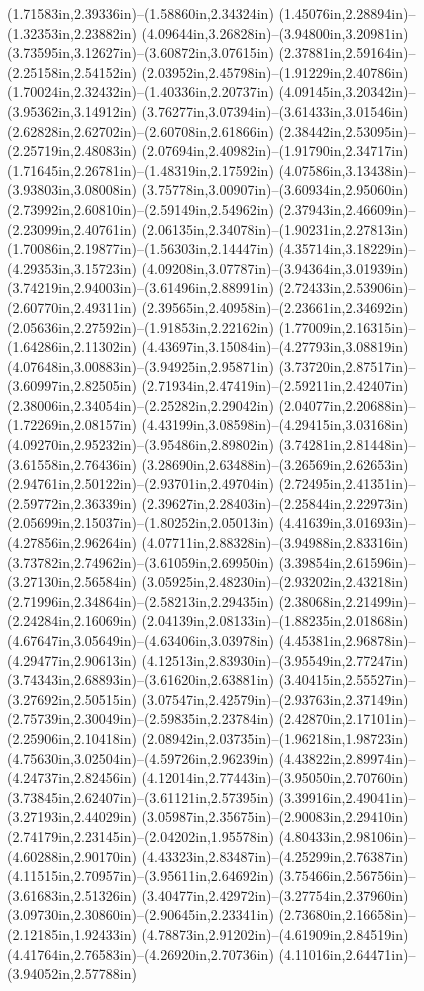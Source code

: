 (1.71583in,2.39336in)--(1.58860in,2.34324in) (1.45076in,2.28894in)--(1.32353in,2.23882in) (4.09644in,3.26828in)--(3.94800in,3.20981in) (3.73595in,3.12627in)--(3.60872in,3.07615in) (2.37881in,2.59164in)--(2.25158in,2.54152in) (2.03952in,2.45798in)--(1.91229in,2.40786in) (1.70024in,2.32432in)--(1.40336in,2.20737in) (4.09145in,3.20342in)--(3.95362in,3.14912in) (3.76277in,3.07394in)--(3.61433in,3.01546in) (2.62828in,2.62702in)--(2.60708in,2.61866in) (2.38442in,2.53095in)--(2.25719in,2.48083in) (2.07694in,2.40982in)--(1.91790in,2.34717in) (1.71645in,2.26781in)--(1.48319in,2.17592in) (4.07586in,3.13438in)--(3.93803in,3.08008in) (3.75778in,3.00907in)--(3.60934in,2.95060in) (2.73992in,2.60810in)--(2.59149in,2.54962in) (2.37943in,2.46609in)--(2.23099in,2.40761in) (2.06135in,2.34078in)--(1.90231in,2.27813in) (1.70086in,2.19877in)--(1.56303in,2.14447in) (4.35714in,3.18229in)--(4.29353in,3.15723in) (4.09208in,3.07787in)--(3.94364in,3.01939in) (3.74219in,2.94003in)--(3.61496in,2.88991in) (2.72433in,2.53906in)--(2.60770in,2.49311in) (2.39565in,2.40958in)--(2.23661in,2.34692in) (2.05636in,2.27592in)--(1.91853in,2.22162in) (1.77009in,2.16315in)--(1.64286in,2.11302in) (4.43697in,3.15084in)--(4.27793in,3.08819in) (4.07648in,3.00883in)--(3.94925in,2.95871in) (3.73720in,2.87517in)--(3.60997in,2.82505in) (2.71934in,2.47419in)--(2.59211in,2.42407in) (2.38006in,2.34054in)--(2.25282in,2.29042in) (2.04077in,2.20688in)--(1.72269in,2.08157in) (4.43199in,3.08598in)--(4.29415in,3.03168in) (4.09270in,2.95232in)--(3.95486in,2.89802in) (3.74281in,2.81448in)--(3.61558in,2.76436in) (3.28690in,2.63488in)--(3.26569in,2.62653in) (2.94761in,2.50122in)--(2.93701in,2.49704in) (2.72495in,2.41351in)--(2.59772in,2.36339in) (2.39627in,2.28403in)--(2.25844in,2.22973in) (2.05699in,2.15037in)--(1.80252in,2.05013in) (4.41639in,3.01693in)--(4.27856in,2.96264in) (4.07711in,2.88328in)--(3.94988in,2.83316in) (3.73782in,2.74962in)--(3.61059in,2.69950in) (3.39854in,2.61596in)--(3.27130in,2.56584in) (3.05925in,2.48230in)--(2.93202in,2.43218in) (2.71996in,2.34864in)--(2.58213in,2.29435in) (2.38068in,2.21499in)--(2.24284in,2.16069in) (2.04139in,2.08133in)--(1.88235in,2.01868in) (4.67647in,3.05649in)--(4.63406in,3.03978in) (4.45381in,2.96878in)--(4.29477in,2.90613in) (4.12513in,2.83930in)--(3.95549in,2.77247in) (3.74343in,2.68893in)--(3.61620in,2.63881in) (3.40415in,2.55527in)--(3.27692in,2.50515in) (3.07547in,2.42579in)--(2.93763in,2.37149in) (2.75739in,2.30049in)--(2.59835in,2.23784in) (2.42870in,2.17101in)--(2.25906in,2.10418in) (2.08942in,2.03735in)--(1.96218in,1.98723in) (4.75630in,3.02504in)--(4.59726in,2.96239in) (4.43822in,2.89974in)--(4.24737in,2.82456in) (4.12014in,2.77443in)--(3.95050in,2.70760in) (3.73845in,2.62407in)--(3.61121in,2.57395in) (3.39916in,2.49041in)--(3.27193in,2.44029in) (3.05987in,2.35675in)--(2.90083in,2.29410in) (2.74179in,2.23145in)--(2.04202in,1.95578in) (4.80433in,2.98106in)--(4.60288in,2.90170in) (4.43323in,2.83487in)--(4.25299in,2.76387in) (4.11515in,2.70957in)--(3.95611in,2.64692in) (3.75466in,2.56756in)--(3.61683in,2.51326in) (3.40477in,2.42972in)--(3.27754in,2.37960in) (3.09730in,2.30860in)--(2.90645in,2.23341in) (2.73680in,2.16658in)--(2.12185in,1.92433in) (4.78873in,2.91202in)--(4.61909in,2.84519in) (4.41764in,2.76583in)--(4.26920in,2.70736in) (4.11016in,2.64471in)--(3.94052in,2.57788in) 